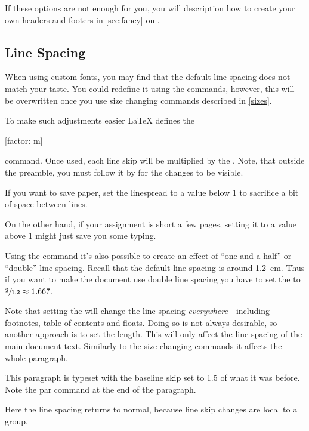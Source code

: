 If these options are not enough for you, you will description how to create
your own headers and footers in \autoref{sec:fancy} on .

\subsection{Line Spacing}

When using custom fonts, you may find that the default line spacing does not
match your taste. You could redefine it using the  commands,
however, this will be overwritten once you use size changing commands described
in \autoref{sizes}.

To make such adjustments easier \LaTeX{} defines the
\begin{lscommand}
  [factor: m]
\end{lscommand}
command. Once used, each line skip will be multiplied by the .
Note, that outside the preamble, you must follow it by  for the
changes to be visible.
\begin{example}
\linespread{0.9}\selectfont
If you want to save paper, set
the linespread to a value
below 1 to sacrifice a bit of
space between lines.

\linespread{1.1}\selectfont
On the other hand, if your
assignment is short a few
pages, setting it to a value
above 1 might just save you
some typing.
\end{example}

Using the  command it's also possible to create an effect of
\enquote{one and a half} or \enquote{double} line spacing. Recall that the
default line spacing is around \qty{1.2}{em}. Thus if you want to make the
document use double line spacing you have to set the  to
\(\sfrac{2}{1.2} \approx 1.667\).

Note that setting the  will change the line spacing
\emph{everywhere}---including footnotes, table of contents and floats. Doing so
is not always desirable, so another approach is to set the 
length. This will only affect the line spacing of the main document text.
Similarly to the size changing commands it affects the whole paragraph.
\begin{example}
{\setlength{\baselineskip}{%
  1.5\baselineskip}
This paragraph is typeset with
the baseline skip set to 1.5 of
what it was before. Note the
par command at the end of the
paragraph.\par}

Here the line spacing returns
to normal, because line skip
changes are local to a group.
\end{example}

